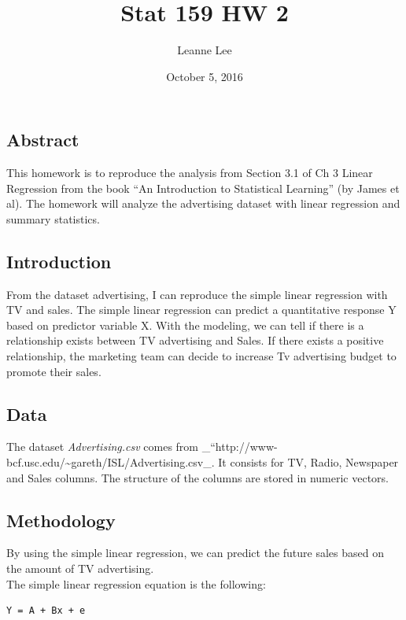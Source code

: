 \documentclass[]{article}
\title{Stat 159 HW 2}
\author{Leanne Lee}
\date{October 5, 2016}
\begin{document}
\maketitle

\subsection{Abstract}\label{abstract}

This homework is to reproduce the analysis from Section 3.1 of Ch 3
Linear Regression from the book ``An Introduction to Statistical
Learning'' (by James et al). The homework will analyze the advertising
dataset with linear regression and summary statistics.

\subsection{Introduction}\label{introduction}

From the dataset advertising, I can reproduce the simple linear
regression with TV and sales. The simple linear regression can predict a
quantitative response Y based on predictor variable X. With the
modeling, we can tell if there is a relationship exists between TV
advertising and Sales. If there exists a positive relationship, the
marketing team can decide to increase Tv advertising budget to promote
their sales.

\subsection{Data}\label{data}

The dataset \emph{Advertising.csv} comes from
\_``http://www-bcf.usc.edu/\textasciitilde{}gareth/ISL/Advertising.csv\_.
It consists for TV, Radio, Newspaper and Sales columns. The structure of
the columns are stored in numeric vectors.

\subsection{Methodology}\label{methodology}

By using the simple linear regression, we can predict the future sales
based on the amount of TV advertising.\\
The simple linear regression equation is the following:

\begin{verbatim}
Y = A + Bx + e
\end{verbatim}
\end{document}
